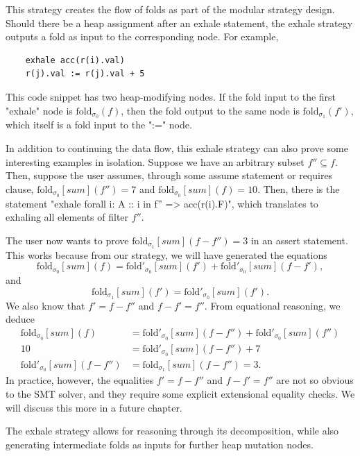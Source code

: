 \documentclass[msc,oneside]{ubcthesis}
\theoremstyle{definition}
\begin{document}
This strategy creates the flow of folds as part of the modular strategy design. Should there be a heap assignment after an exhale statement, the exhale strategy outputs a fold as input to the corresponding node. For example,
\begin{lstlisting}
    exhale acc(r(i).val)
    r(j).val := r(j).val + 5
\end{lstlisting}
This code snippet has two heap-modifying nodes. If the fold input to the first "exhale" node is $\textrm{fold}_{\sigma_0}(f)$, then the fold output to the same node is $\textrm{fold}_{\sigma_1}(f')$, which itself is a fold input to the ":=" node.

In addition to continuing the data flow, this exhale strategy can also prove some interesting examples in isolation. Suppose we have an arbitrary subset $f'' \subseteq f$. Then, suppose the user assumes, through some assume statement or requires clause, $\textrm{fold}_{\sigma_0}[\textit{sum}](f'') = 7$ and $\textrm{fold}_{\sigma_0}[\textit{sum}](f) = 10$. Then, there is the statement 
"exhale forall i: A :: i in f'' => acc(r(i).F)", which translates to exhaling all elements of filter $f''$. 

The user now wants to prove $\textrm{fold}_{\sigma_1}[\textit{sum}](f - f'') = 3$ in an assert statement. This works because from our strategy, we will have generated the equations
$$\textrm{fold}_{\sigma_0}[\textit{sum}](f) = \textrm{fold}'_{\sigma_0}[\textit{sum}](f') + \textrm{fold}'_{\sigma_0}[\textit{sum}](f - f'), $$ and
$$\textrm{fold}_{\sigma_1}[\textit{sum}](f') = \textrm{fold}'_{\sigma_0}[\textit{sum}](f'). $$
We also know that $f' = f - f''$ and $f - f' = f''$. From equational reasoning, we deduce
\begin{align*} 
\textrm{fold}_{\sigma_0}[\textit{sum}](f) &= \textrm{fold}'_{\sigma_0}[\textit{sum}](f - f'') + \textrm{fold}'_{\sigma_0}[\textit{sum}](f'') \\
10 &= \textrm{fold}'_{\sigma_0}[\textit{sum}](f - f'') + 7 \\
\textrm{fold}'_{\sigma_0}[\textit{sum}](f - f'') &= \textrm{fold}_{\sigma_1}[\textit{sum}](f - f'') = 3. 
\end{align*}
In practice, however, the equalities $f' = f - f''$ and $f - f' = f''$ are not so obvious to the SMT solver, and they require some explicit extensional equality checks. We will discuss this more in a future chapter.

The exhale strategy allows for reasoning through its decomposition, while also generating intermediate folds as inputs for further heap mutation nodes.
\end{document}
